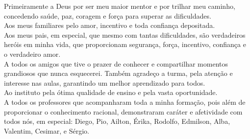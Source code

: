 
Primeiramente a Deus por ser meu maior mentor e por trilhar meu caminho, concedendo saúde, paz, coragem e força para superar as dificuldades. 
\\
\indent
Aos meus familiares pelo amor, incentivo e toda confiança depositada.
\\
\indent
Aos meus pais, em especial, que mesmo com tantas dificuldades, são verdadeiros heróis em minha vida, que proporcionam segurança, força, incentivo, confiança e o verdadeiro amor.
\\
\indent
A todos os amigos que tive o prazer de conhecer e compartilhar momentos grandiosos que nunca esquecerei. Também agradeço a turma, pela atenção e interesse nas aulas, garantindo um melhor aprendizado para todos.
\\
\indent
Ao instituto pela ótima qualidade de ensino e pela vasta oportunidade.
\\
\indent
A todos os professores que acompanharam toda a minha formação, pois além de proporcionar o conhecimento racional, demonstraram caráter e afetividade com todos nós, em especial: Diego, Pio, Ailton, Érika, Rodolfo, Edmilson, Alba, Valentim, Cesimar,  e Sérgio.
